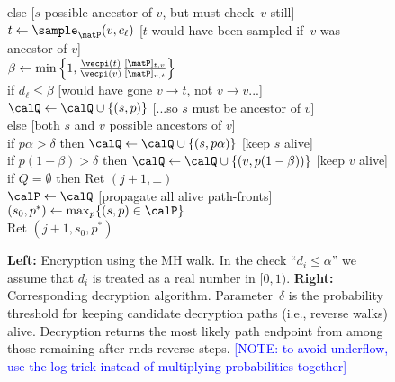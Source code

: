 \begin{figure}
{\nnudge else \hfill{\tiny [$s$ possible ancestor of $v$, but must check~$v$ still]}\\
\nnudge\nudge $t \gets \sample_{\matP}(v,c_\ell)$ \hfill{\tiny [$t$
  would have been sampled if~$v$ was ancestor of $v$]}\\
\nnudge\nudge $\beta \gets \min\left\{1,\frac{\vecpi(t)}{\vecpi(v)}\frac{[\matP]_{t,v}}{[\matP]_{v,t}} \right\}$\\
\nnudge\nudge if $d_\ell \leq \beta$ \hfill{\tiny [would have gone $v\to t$, not $v \to v$...]}\\ 
\nnudge\nudge\nudge $\calQ \gets \calQ \cup \{(s,p)\}$ \hfill{\tiny [...so $s$ must be ancestor of $v$]}\\
\nnudge\nudge else  \hfill{\tiny [both $s$ and $v$ possible ancestors of $v$]}\\
\nnudge\nudge\nudge if $p\alpha > \delta$ then $\calQ \gets \calQ \cup \{(s,p\alpha)\}$ \hfill{\tiny [keep $s$ alive]}  \\
\nnudge\nudge\nudge if $p(1-\beta) > \delta$ then $\calQ \gets \calQ \cup \{(v,p(1-\beta))\}$ \hfill{\tiny [keep $v$ alive]} \\
\nudge if $Q = \emptyset$ then Ret $(j+1,\bot)$\\
\nudge $\calP \gets \calQ$ \hfill{\tiny [propagate all alive path-fronts]}\\
$(s_0,p^*) \gets \max_{p}\{ (s,p) \in \calP \}$\\
Ret $(j+1,s_0,p^*)$ 
} 
\caption{\textbf{Left:} Encryption using the MH walk. In the check ``$d_i
\leq \alpha$'' we assume that $d_i$ is treated as a real number in 
$[0,1)$. \textbf{Right:} Corresponding decryption algorithm.
Parameter~$\delta$ is the probability threshold for keeping candidate
decryption paths (i.e., reverse walks) alive.  Decryption returns the
most likely path endpoint from among those remaining after
$\mathrm{rnds}$ reverse-steps. \textcolor{blue}{[NOTE: to avoid underflow, use the
log-trick instead of multiplying probabilities together]}}
\label{fig:walk-encrypt} 
\end{figure}




